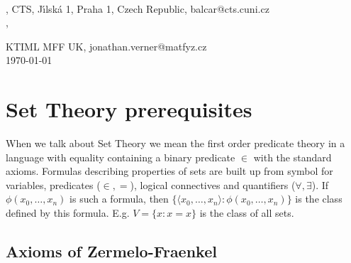 \documentclass[a4paper,11pt,oneside]{mybook}
\theoremstyle{theorem}
\theoremstyle{example}
\begin{document}
\cfoot{}\rhead{\thepage}

 \\[0.1cm]

, {\small CTS, J{\' \i}lsk{\' a} 1, Praha 1,
	Czech Republic, {\ttfamily balcar@cts.cuni.cz} } \\[0.1cm]
, {\small KTIML MFF UK, {\ttfamily jonathan.verner@matfyz.cz}\\[0.1cm]
{\tiny \today } \\[0.5cm]


\thispagestyle{empty}


\section{Set Theory prerequisites}

When we talk about Set Theory we mean the first order predicate theory in a language with equality containing a binary predicate $\in$
with the standard axioms. Formulas describing properties of sets are built up from symbol for variables, predicates ($\in,=$),
logical connectives and quantifiers ($\forall,\exists$). If $\phi(x_0,\ldots,x_n)$ is such a formula, then $\{\langle x_0,\ldots, x_n\rangle:
\phi(x_0,\ldots,x_n)\}$ is the class defined by this formula. E.g. $V=\{x:x=x\}$ is the class of all sets.

\subsection{Axioms of Zermelo-Fraenkel}


}
\end{document}
